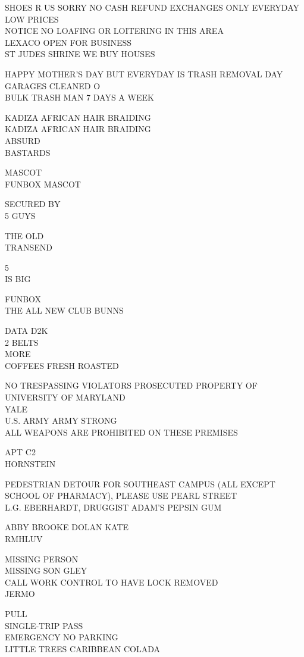 \documentclass[10pt,letterpaper]{article}
\begin{document}
SHOES R US SORRY NO CASH REFUND EXCHANGES ONLY EVERYDAY LOW PRICES\\
NOTICE NO LOAFING OR LOITERING IN THIS AREA\\
LEXACO OPEN FOR BUSINESS\\
ST JUDES SHRINE WE BUY HOUSES

HAPPY MOTHER'S DAY BUT EVERYDAY IS TRASH REMOVAL DAY\\
GARAGES CLEANED O\\
BULK TRASH MAN 7 DAYS A WEEK

KADIZA AFRICAN HAIR BRAIDING\\
KADIZA AFRICAN HAIR BRAIDING\\
ABSURD\\
BASTARDS

MASCOT\\
FUNBOX MASCOT

SECURED BY\\
5 GUYS

THE OLD\\
TRANSEND

5\\
IS BIG

FUNBOX\\
THE ALL NEW CLUB BUNNS

DATA D2K\\
2 BELTS\\
MORE\\
COFFEES FRESH ROASTED

NO TRESPASSING VIOLATORS PROSECUTED PROPERTY OF UNIVERSITY OF MARYLAND\\
YALE\\
U.S. ARMY ARMY STRONG\\
ALL WEAPONS ARE PROHIBITED ON THESE PREMISES

APT C2\\
HORNSTEIN

PEDESTRIAN DETOUR FOR SOUTHEAST CAMPUS (ALL EXCEPT SCHOOL OF PHARMACY), PLEASE USE PEARL STREET\\
L.G. EBERHARDT, DRUGGIST ADAM'S PEPSIN GUM

ABBY BROOKE DOLAN KATE\\
RMHLUV

MISSING PERSON\\
MISSING SON GLEY\\
CALL WORK CONTROL TO HAVE LOCK REMOVED\\
JERMO

PULL\\
SINGLE{-}TRIP PASS\\
EMERGENCY NO PARKING\\
LITTLE TREES CARIBBEAN COLADA
\end{document}

